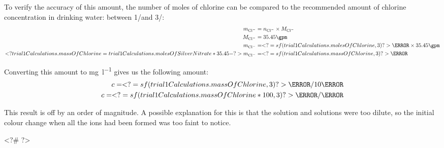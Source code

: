 \documentclass[12pt, demo]{article}
\begin{document}
To verify the accuracy of this amount, the number of moles of chlorine can be compared to the recommended amount of chlorine concentration in drinking water: between 1\mg/\litre and 3\mg/\litre:
%
\begin{align*}
	m_{\ce{Cl^-}} & = n_{\ce{Cl^-}} \times M_{\ce{Cl^-}}
	\\
	M_{\ce{Cl^-}} & = 35.45\gpm
	\\
	m_{\ce{Cl^-}} & = <?= sf(trial1Calculations.molesOfChlorine, 3) ?>\mmol \times 35.45\gpm
	\\
	<? trial1Calculations.massOfChlorine = trial1Calculations.molesOfSilverNitrate * 35.45 -?>
	m_{\ce{Cl^-}} & = <?= sf(trial1Calculations.massOfChlorine, 3) ?>\mg
\end{align*}

Converting this amount to \si{\mg\per\litre} gives us the following amount:
%
\begin{align*}
	c = <?= sf(trial1Calculations.massOfChlorine, 3) ?>\mg/10\ml
	\\
	c = <?= sf(trial1Calculations.massOfChlorine * 100, 3) ?>\mg/\litre
\end{align*}

This result is off by an order of magnitude. A possible explanation for this is that the  solution and  solutions were too dilute, so the initial colour change when all the  ions had been formed was too faint to notice.


<?#
?>
\end{document}
